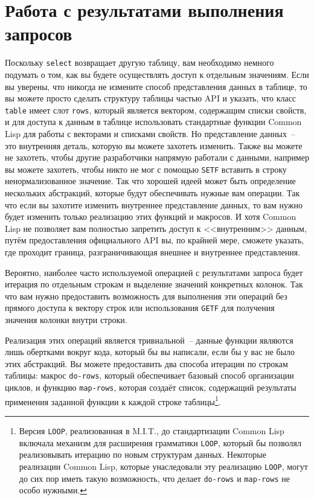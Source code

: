 \section{Работа с результатами выполнения запросов}

Поскольку \lstinline{select} возвращает другую таблицу, вам необходимо немного подумать о том,
как вы будете осуществлять доступ к отдельным значениям.  Если вы уверены, что никогда
не измените способ представления данных в таблице, то вы можете просто сделать структуру
таблицы частью API и указать, что класс \lstinline{table} имеет слот \lstinline{rows}, который
является вектором, содержащим списки свойств, и для доступа к данным в таблице использовать
стандартные функции Common Lisp для работы с векторами и списками свойств.  Но
представление данных~-- это внутренняя деталь, которую вы можете захотеть изменить.
Также вы можете не захотеть, чтобы другие разработчики напрямую работали с данными,
например вы можете захотеть, чтобы никто не мог с помощью \lstinline{SETF} вставить в строку
ненормализованное значение.  Так что хорошей идеей может быть определение нескольких
абстракций, которые будут обеспечивать нужные вам операции.  Так что если вы захотите
изменить внутреннее представление данных, то вам нужно будет изменить только реализацию
этих функций и макросов.  И хотя Common Lisp не позволяет вам полностью запретить доступ к
<<внутренним>> данным, путём предоставления официального API вы, по крайней мере, сможете
указать, где проходит граница, разграничивающая внешнее и внутреннее представления.

Вероятно, наиболее часто используемой операцией с результатами запроса будет итерация по
отдельным строкам и выделение значений конкретных колонок.  Так что вам нужно
предоставить возможность для выполнения эти операций без прямого доступа к вектору строк
или использования \lstinline{GETF} для получения значения колонки внутри строки.

Реализация этих операций является тривиальной~-- данные функции являются лишь обертками
вокруг кода, который бы вы написали, если бы у вас не было этих абстракций.  Вы можете
предоставить два способа итерации по строкам таблицы: макрос \lstinline{do-rows}, который
обеспечивает базовый способ организации циклов, и функцию \lstinline{map-rows}, которая создаёт
список, содержащий результаты применения заданной функции к каждой строке
таблицы\footnote{Версия \lstinline{LOOP}, реализованная в M.I.T., до стандартизации Common Lisp
  включала механизм для расширения грамматики \lstinline{LOOP}, который бы позволял
  реализовывать итерацию по новым структурам данных.  Некоторые реализации Common Lisp,
  которые унаследовали эту реализацию \lstinline{LOOP}, могут до сих пор иметь такую возможность,
  что делает \lstinline{do-rows} и \lstinline{map-rows} не особо нужными.}\hspace{\footnotenegspace}.

